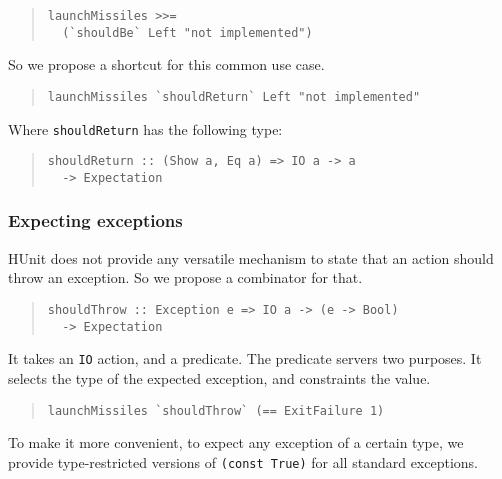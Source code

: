 \documentclass[preprint]{sigplanconf}
\begin{document}
\begin{quote}\small\begin{verbatim}
launchMissiles >>=
  (`shouldBe` Left "not implemented")
\end{verbatim}\end{quote}

\noindent So we propose a shortcut for this common use case.

\begin{quote}\small\begin{verbatim}
launchMissiles `shouldReturn` Left "not implemented"
\end{verbatim}\end{quote}

\noindent Where \verb|shouldReturn| has the following type:

\begin{quote}\small\begin{verbatim}
shouldReturn :: (Show a, Eq a) => IO a -> a
  -> Expectation
\end{verbatim}\end{quote}


\subsubsection{Expecting exceptions}

HUnit does not provide any versatile mechanism to state that an action
should throw an exception.  So we propose a combinator for that.

\begin{quote}\small\begin{verbatim}
shouldThrow :: Exception e => IO a -> (e -> Bool)
  -> Expectation
\end{verbatim}\end{quote}

\noindent It takes an {\tt IO} action, and a predicate.  The predicate
servers two purposes.  It selects the type of the expected exception,
and constraints the value.

\begin{quote}\small\begin{verbatim}
launchMissiles `shouldThrow` (== ExitFailure 1)
\end{verbatim}\end{quote}

\noindent To make it more convenient, to expect any exception of a
certain type, we provide type-restricted versions of {\tt (const
True)} for all standard exceptions.
\end{document}
